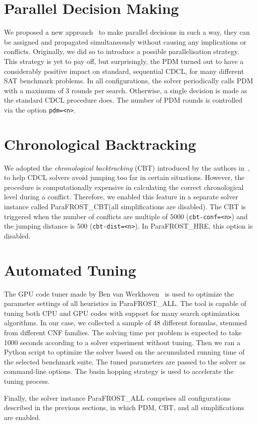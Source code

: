 \documentclass[conference]{IEEEtran}
\newcommand{\parafrostHRE}{ParaFROST\_HRE\xspace}
\newcommand{\parafrostCBT}{ParaFROST\_CBT\xspace}
\newcommand{\parafrostALL}{ParaFROST\_ALL\xspace}
\begin{document}
\section{Parallel Decision Making}
We proposed a new approach~\cite{pdcl} to make parallel decisions in such a way, they can be assigned and propagated simultaneously without causing any implications or conflicts. Originally, we did so to introduce a possible parallelisation strategy. This strategy is yet to pay off, but surprisingly, the PDM turned out to have
a considerably positive impact on standard, sequential CDCL, for many different SAT benchmark problems. In all configurations, the solver periodically calls PDM with a maximum of 3 rounds per search. Otherwise, a single decision is made as the standard CDCL procedure does. The number of PDM rounds is controlled via the option \texttt{pdm=<n>}. 
%
%
\section{Chronological Backtracking}
We adopted the \emph{chronological backtracking} (CBT) introduced by the authors in~\cite{cbt}, to help CDCL solvers avoid jumping too far in certain situations. However, the procedure is computationally expensive in calculating the correct chronological level during a conflict. Therefore, we enabled this feature in a separate solver instance called \parafrostCBT (all simplifications are disabled). The CBT is triggered when the number of conflicts are multiple of 5000 (\texttt{cbt-conf=<n>}) and the jumping distance is 500 (\texttt{cbt-dist=<n>}). In \parafrostHRE, this option is disabled.
%
%
\section{Automated Tuning}
The GPU code tuner made by Ben van Werkhoven~\cite{tuner,tunerCode} is used to optimize the parameter settings of all heuristics in \parafrostALL. The tool is capable of tuning both CPU and GPU codes with support for many search optimization algorithms. In our case, we collected a sample of 48 different formulas, stemmed from different CNF families. The solving time per problem is expected to take 1000 seconds according to a solver experiment without tuning. Then we ran a Python script to optimize the solver based on the accumulated running time of the selected benchmark suite. The tuned parameters are passed to the solver as command-line options. The basin hopping strategy is used to accelerate the tuning process.

Finally, the solver instance \parafrostALL comprises all configurations described in the previous sections, in which PDM, CBT, and all simplifications are enabled.



\end{document}
